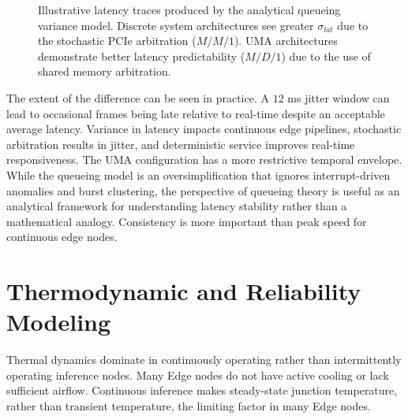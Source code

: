 \documentclass[conference]{IEEEtran}
\begin{document}
\begin{figure}[htbp]
\centering
{}
\caption{Illustrative latency traces produced by the analytical queueing variance model. Discrete system architectures see greater $\sigma_{lat}$ due to the stochastic PCIe arbitration ($M/M/1$). UMA architectures demonstrate better latency predictability ($M/D/1$) due to the use of shared memory arbitration.}
\label{fig:jitter}
\end{figure}

The extent of the difference can be seen in practice. A $12$ ms jitter window can lead to occasional frames being late relative to real-time despite an acceptable average latency. Variance in latency impacts continuous edge pipelines, stochastic arbitration results in jitter, and deterministic service improves real-time responsiveness. The UMA configuration has a more restrictive temporal envelope. While the queueing model is an oversimplification that ignores interrupt-driven anomalies and burst clustering, the perspective of queueing theory is useful as an analytical framework for understanding latency stability rather than a mathematical analogy. Consistency is more important than peak speed for continuous edge nodes.

\section{Thermodynamic and Reliability Modeling}

Thermal dynamics dominate in continuously operating rather than intermittently operating inference nodes. Many Edge nodes do not have active cooling or lack sufficient airflow. Continuous inference makes steady-state junction temperature, rather than transient temperature, the limiting factor in many Edge nodes.
\end{document}

